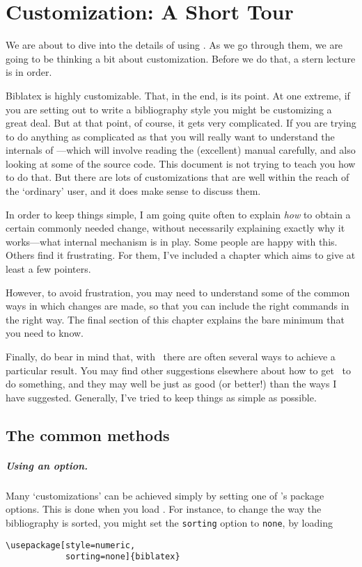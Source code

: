 \chapter{Customization: A Short Tour}

We are about to dive into the details of using \biblatex. As we go
through them, we are going to be thinking a bit about
customization. Before we do that, a stern lecture is in order.

\textsf{Biblatex} is highly customizable. That, in the end, is
its point. At one extreme, if you are setting out to write a
bibliography style you might be customizing a great deal. But at that
point, of course, it gets very complicated. If you are trying to do
anything as complicated as that you will really want to understand the
internals of \biblatex---which will involve reading the (excellent)
manual carefully, and also looking at some of the source code. This
document is not trying to teach you how to do that. But there are lots
of customizations that are well within the reach of the `ordinary'
user, and it does make sense to discuss them.

In order to keep things simple, I am going quite often to
explain \emph{how} to obtain a certain commonly needed change, without
necessarily explaining exactly why it works---what internal mechanism
is in play. Some people are happy
with this. Others find it frustrating. For them, I've included a
chapter which aims to give at least a few pointers.

However, to avoid frustration, you may need to understand some of the
common ways in which changes are made, so that you can include the
right commands in the right way. The final section of this chapter
explains the bare minimum that you need to know.

Finally, do bear in mind that, with \biblatex\ there are often several
ways to achieve a particular result. You may find other suggestions
elsewhere about how to get \biblatex\ to do something, and they may
well be just as good (or better!) than the ways I have
suggested. Generally, I've tried to keep things as simple as possible.

\section{The common methods}

\paragraph{Using an option.} Many `customizations' can be achieved
simply by setting one of \biblatex's package options. This is done
when you load \biblatex. For instance, to change the way the
bibliography is sorted, you might set the \verb|sorting| option to
\verb|none|, by loading
\begin{verbatim}
\usepackage[style=numeric,
            sorting=none]{biblatex}
\end{verbatim}

